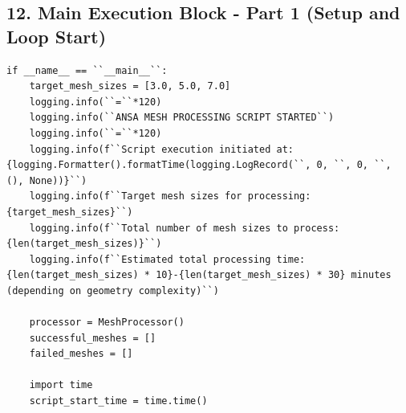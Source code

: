 \documentclass{book}
\begin{document}
\begin{itemize}[leftmargin=*,label=\textbullet]
\subsection*{12. Main Execution Block - Part 1 (Setup and Loop Start)}
\begin{lstlisting}[caption={Main Execution Block - Setup and Loop Start},label={lst:main_1}]
if __name__ == ``__main__``:
    target_mesh_sizes = [3.0, 5.0, 7.0]
    logging.info(``=``*120)
    logging.info(``ANSA MESH PROCESSING SCRIPT STARTED``)
    logging.info(``=``*120)
    logging.info(f``Script execution initiated at: {logging.Formatter().formatTime(logging.LogRecord(``, 0, ``, 0, ``, (), None))}``)
    logging.info(f``Target mesh sizes for processing: {target_mesh_sizes}``)
    logging.info(f``Total number of mesh sizes to process: {len(target_mesh_sizes)}``)
    logging.info(f``Estimated total processing time: {len(target_mesh_sizes) * 10}-{len(target_mesh_sizes) * 30} minutes (depending on geometry complexity)``)

    processor = MeshProcessor()
    successful_meshes = []
    failed_meshes = []

    import time
    script_start_time = time.time()


\end{lstlisting}
\end{itemize}
\end{document}
